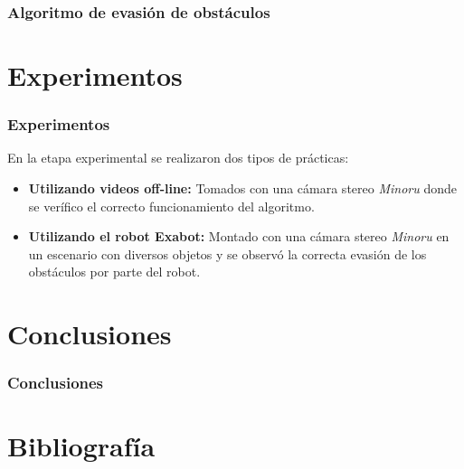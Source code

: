 \documentclass[svgnames]{beamer}
\begin{document}
%
%

\begin{frame}
\frametitle{Algoritmo de evasi\'on de obst\'aculos}


\end{frame}

\section{Experimentos}

\begin{frame}
\frametitle{Experimentos}
En la etapa experimental se realizaron dos tipos de pr\'acticas:
\begin{itemize}

	\item {\bf Utilizando videos off-line:} Tomados con una c\'amara stereo \emph{Minoru} donde se ver\'ifico el correcto funcionamiento del algoritmo.
	
	\item {\bf Utilizando el robot Exabot:} Montado con una c\'amara stereo \emph{Minoru} en un escenario con diversos objetos y se observ\'o la correcta evasi\'on de los obst\'aculos por parte del robot.
\end{itemize}

\end{frame}


\section{Conclusiones}

\begin{frame}
\frametitle{Conclusiones}




\end{frame}

\section{Bibliograf\'ia}
\end{document}
